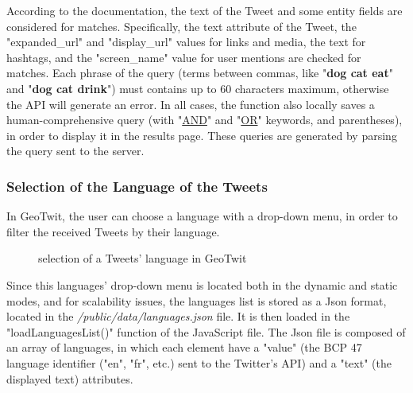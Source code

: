 \documentclass[a4paper,11pt]{report}
\begin{document}
According to the documentation, the text of the Tweet and some entity fields are considered for matches. Specifically, the text attribute of the Tweet, the "expanded\_url" and "display\_url" values for links and media, the text for hashtags, and the "screen\_name" value for user mentions are checked for matches. Each phrase of the query (terms between commas, like "\textbf{dog cat eat}" and "\textbf{dog cat drink}") must contains up to 60 characters maximum, otherwise the API will generate an error.
In all cases, the function also locally saves a human-comprehensive query (with "\underline{AND}" and "\underline{OR}" keywords, and parentheses), in order to display it in the results page. These queries are generated by parsing the query sent to the server.
\newpage

\subsubsection{Selection of the Language of the Tweets}
In GeoTwit, the user can choose a language with a drop-down menu, in order to filter the received Tweets by their language.
\begin{figure}[H]
\vspace{-5pt}
\begin{center}
\vspace{-20pt}
\caption{selection of a Tweets' language in GeoTwit}
\end{center}
\end{figure}

Since this languages' drop-down menu is located both in the dynamic and static modes, and for scalability issues, the languages list is stored as a Json format, located in the \emph{/public/data/languages.json} file. It is then loaded in the "loadLanguagesList()" function of the JavaScript file. The Json file is composed of an array of languages, in which each element have a "value" (the BCP 47 language identifier ("en", "fr", etc.) sent to the Twitter's API) and a "text" (the displayed text) attributes.\\
\end{document}
